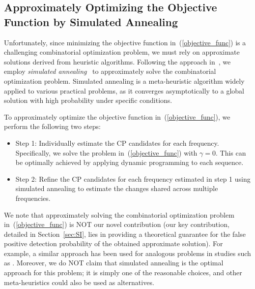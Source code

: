\subsection{Approximately Optimizing the Objective Function by Simulated Annealing}

%
Unfortunately, since minimizing the objective function in~(\ref{objective_func}) is a challenging combinatorial optimization problem, we must rely on approximate solutions derived from heuristic algorithms.
%
Following the approach in~\citet{lavielle1998optimal}, we employ \emph{simulated annealing}~\citep{kirkpatrick1983optimization, cerny1985thermodynamical} to approximately solve the combinatorial optimization problem.
%
Simulated annealing is a meta-heuristic algorithm widely applied to various practical problems, as it converges asymptotically to a global solution with high probability under specific conditions.

To approximately optimize the objective function in~(\ref{objective_func}), we perform the following two steps:
%
\begin{itemize}
 \item
      Step 1: Individually estimate the CP candidates for each frequency.
      Specifically, we solve the problem in~(\ref{objective_func}) with $\gamma = 0$.
      This can be optimally achieved by applying dynamic programming to each sequence.
      
 \item
      Step 2: Refine the CP candidates for each frequency estimated in step 1 using simulated annealing to estimate the changes shared across multiple frequencies.
\end{itemize}

We note that approximately solving the combinatorial optimization problem in~(\ref{objective_func}) is NOT our novel contribution (our key contribution, detailed in Section~\ref{sec:SI}, lies in providing a theoretical guarantee for the false positive detection probability of the obtained approximate solution).
%
For example, a similar approach has been used for analogous problems in studies such as \citet{lavielle1998optimal}.
%
Moreover, we do NOT claim that simulated annealing is the optimal approach for this problem; it is simply one of the reasonable choices, and other meta-heuristics could also be used as alternatives.

